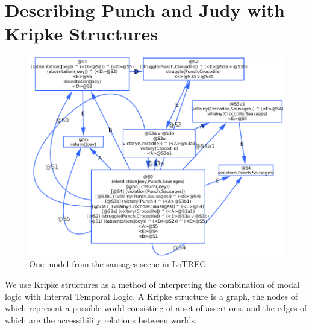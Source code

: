 \documentclass{llncs}
\begin{document}
\section{Describing Punch and Judy with Kripke Structures}\label{sec:kripke}
\begin{figure}[!t]
  \centering
    \centerline{\includegraphics[width=1.0\textwidth]{kripke.png}}
  \caption{One model from the sausages scene in LoTREC}\label{fig:lotrec}
\end{figure}
We use Kripke structures \cite{kripke1963semantical} as a method of interpreting the combination of modal logic with Interval Temporal Logic. A Kripke structure is a graph, the nodes of which represent a possible world consisting of a set of assertions, and the edges of which are the accessibility relations between worlds.
\end{document}
